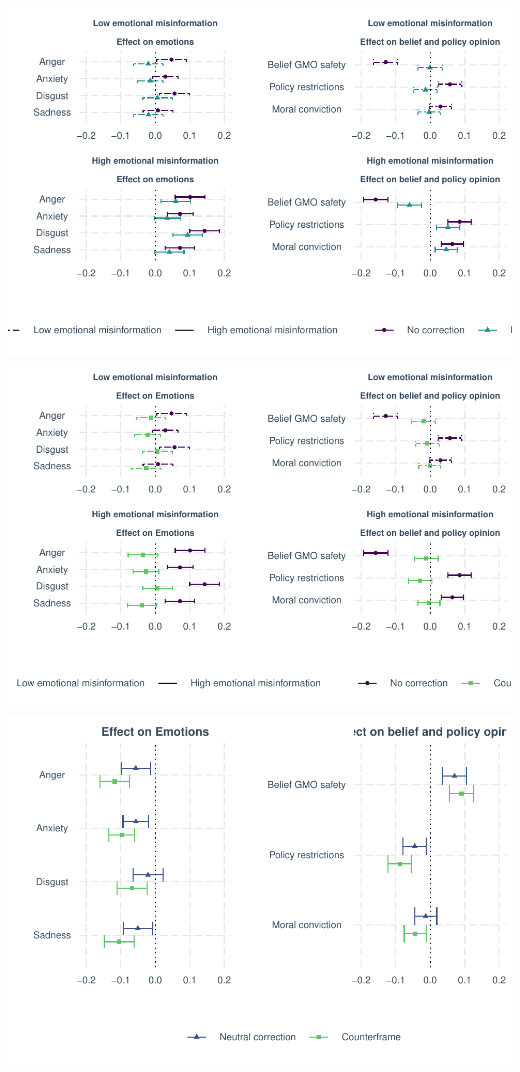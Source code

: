 \documentclass[
  12pt,
]{article}
\begin{document}
\includegraphics{paper_files/figure-latex/unnamed-chunk-6-1.pdf} \includegraphics{paper_files/figure-latex/unnamed-chunk-6-2.pdf} \includegraphics{paper_files/figure-latex/unnamed-chunk-6-3.pdf}
\end{document}

